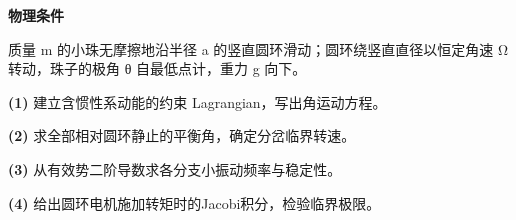 \textbf{物理条件}\par 质量 m 的小珠无摩擦地沿半径 a 的竖直圆环滑动；圆环绕竖直直径以恒定角速 Ω 转动，珠子的极角 θ 自最低点计，重力 g 向下。
\par\noindent\textbf{(1)} 建立含惯性系动能的约束 Lagrangian，写出角运动方程。
\par\noindent\textbf{(2)} 求全部相对圆环静止的平衡角，确定分岔临界转速。
\par\noindent\textbf{(3)} 从有效势二阶导数求各分支小振动频率与稳定性。
\par\noindent\textbf{(4)} 给出圆环电机施加转矩时的Jacobi积分，检验临界极限。
